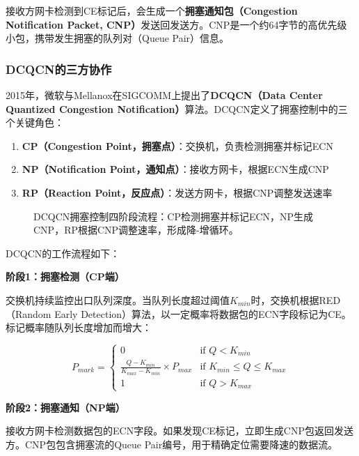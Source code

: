 接收方网卡检测到CE标记后，会生成一个\textbf{拥塞通知包（Congestion Notification Packet, CNP）}发送回发送方。CNP是一个约64字节的高优先级小包，携带发生拥塞的队列对（Queue Pair）信息。

\subsubsection{DCQCN的三方协作}

2015年，微软与Mellanox在SIGCOMM上提出了\textbf{DCQCN（Data Center Quantized Congestion Notification）}算法。DCQCN定义了拥塞控制中的三个关键角色：

\begin{enumerate}
    \item \textbf{CP（Congestion Point，拥塞点）}：交换机，负责检测拥塞并标记ECN
    \item \textbf{NP（Notification Point，通知点）}：接收方网卡，根据ECN生成CNP
    \item \textbf{RP（Reaction Point，反应点）}：发送方网卡，根据CNP调整发送速率
\end{enumerate}

\begin{figure}[htbp]
\centering

\caption{DCQCN拥塞控制四阶段流程：CP检测拥塞并标记ECN，NP生成CNP，RP根据CNP调整速率，形成降-增循环。}
\label{fig:dcqcn_flow}
\end{figure}

DCQCN的工作流程如下：

\textbf{阶段1：拥塞检测（CP端）}

交换机持续监控出口队列深度。当队列长度超过阈值$K_{min}$时，交换机根据RED（Random Early Detection）算法，以一定概率将数据包的ECN字段标记为CE。标记概率随队列长度增加而增大：

\begin{equation}
P_{mark} = \begin{cases}
0 & \text{if } Q < K_{min} \\
\frac{Q - K_{min}}{K_{max} - K_{min}} \times P_{max} & \text{if } K_{min} \leq Q \leq K_{max} \\
1 & \text{if } Q > K_{max}
\end{cases}
\end{equation}

\textbf{阶段2：拥塞通知（NP端）}

接收方网卡检测数据包的ECN字段。如果发现CE标记，立即生成CNP包返回发送方。CNP包包含拥塞流的Queue Pair编号，用于精确定位需要降速的数据流。

